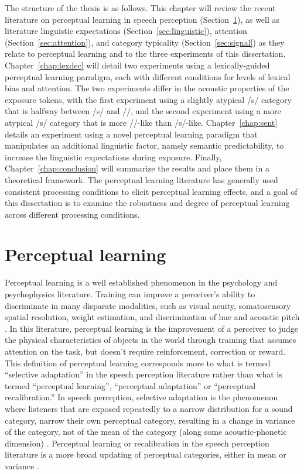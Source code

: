 The structure of the thesis is as follows.
This chapter will review the recent literature on perceptual learning in speech perception (Section~\ref{sec:perceptuallearning}), as well as literature linguistic expectations (Section~\ref{sec:linguistic}), attention (Section~\ref{sec:attention}), and category typicality (Section~\ref{sec:signal}) as they relate to perceptual learning and to the three experiments of this dissertation.
Chapter~\ref{chap:lexdec} will detail two experiments using a lexically-guided perceptual learning paradigm, each with different conditions for levels of lexical bias and attention.  
The two experiments differ in the acoustic properties of the exposure tokens, with the first experiment using a slightly atypical /s/ category that is halfway between /s/ and /\textesh/, and the second experiment using a more atypical /s/ category that is more /\textesh/-like than /s/-like.  
Chapter~\ref{chap:sent} details an experiment using a novel perceptual learning paradigm that manipulates an additional linguistic factor, namely semantic predictability, to increase the linguistic expectations during exposure.
Finally, Chapter~\ref{chap:conclusion} will summarize the results and place them in a theoretical framework.
The perceptual learning literature has generally used consistent processing conditions to elicit perceptual learning effects, and a goal of this dissertation is to examine the robustness and degree of perceptual learning across different processing conditions.

\section{Perceptual learning}
\label{sec:perceptuallearning}

Perceptual learning is a well established phenomenon in the psychology and psychophysics literature. 
Training can improve a perceiver's ability to discriminate in many disparate modalities, such as visual acuity, somatosensory spatial resolution, weight estimation, and discrimination of hue and acoustic pitch \citep[for review]{Gibson1953}. 
In this literature, perceptual learning is the improvement of a perceiver to judge the physical characteristics of objects in the world through training that assumes attention on the task, but doesn't require reinforcement, correction or reward.
This definition of perceptual learning corresponds more to what is termed ``selective adaptation'' in the speech perception literature rather than what is termed ``perceptual learning'', ``perceptual adaptation'' or ``perceptual recalibration.''  
In speech perception, selective adaptation is the phenomenon where listeners that are exposed repeatedly to a narrow distribution for a sound category, narrow their own perceptual category, resulting in a change in variance of the category, not of the mean of the category (along some acoustic-phonetic dimension) \citep{Eimas1973,Samuel1986,Vroomen2007}.
Perceptual learning or recalibration in the speech perception literature is a more broad updating of perceptual categories, either in mean or variance \citep{Norris2003, Vroomen2007}.

